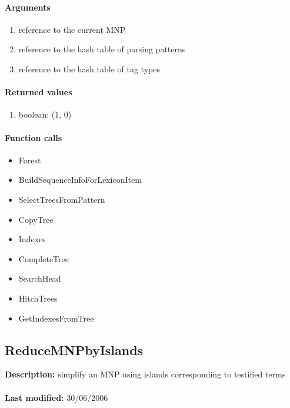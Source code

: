 \paragraph{Arguments}
\begin{enumerate}
\item reference to the current MNP
\item reference to the hash table of parsing patterns
\item reference to the hash table of tag types
\end{enumerate}

\paragraph{Returned values}
\begin{enumerate}
\item boolean: (1, 0)
\end{enumerate}

\paragraph{Function calls}
\begin{itemize}
\item Forest
\item BuildSequenceInfoForLexiconItem
\item SelectTreesFromPattern
\item CopyTree
\item Indexes
\item CompleteTree
\item SearchHead
\item HitchTrees
\item GetIndexesFromTree
\end{itemize}

\subsection{ReduceMNPbyIslands}
\textbf{Description:} simplify an MNP using islands corresponding to testified terms\\
\\\textbf{Last modified:} 30/06/2006

